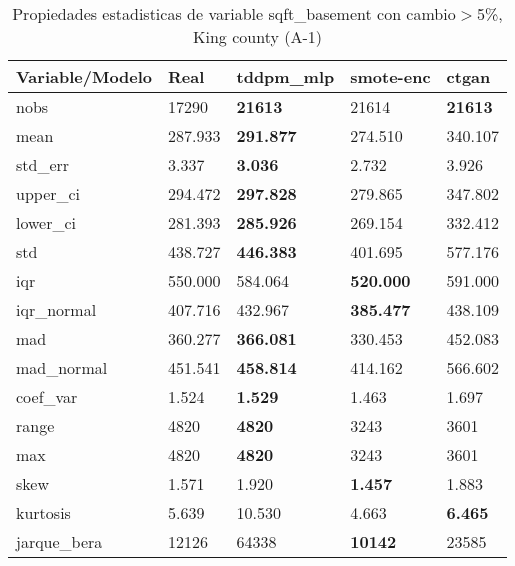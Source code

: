 \begin{table}[H]
\centering
\fontsize{8}{14}\selectfont
\caption{Propiedades estadisticas de variable sqft\_basement con cambio\ensuremath{>}5\%, King county (A-1)}
\label{table-stats-king county-a-1-sqft_basement-short}
\begin{tabular}{|l|m{10em}|m{10em}|m{10em}|m{10em}|}
\hline
 \rowcolor[gray]{0.8}
Variable/Modelo & Real & tddpm\_mlp & smote-enc & ctgan \\
\hline nobs & 17290 & \bfseries 21613 & \cellcolor[rgb]{0.9, 0.54, 0.52} 21614 & \bfseries 21613 \\
\hline mean & 287.933 & \bfseries 291.877 & 274.510 & \cellcolor[rgb]{0.9, 0.54, 0.52} 340.107 \\
\hline std\_err & 3.337 & \bfseries 3.036 & \cellcolor[rgb]{0.9, 0.54, 0.52} 2.732 & 3.926 \\
\hline upper\_ci & 294.472 & \bfseries 297.828 & 279.865 & \cellcolor[rgb]{0.9, 0.54, 0.52} 347.802 \\
\hline lower\_ci & 281.393 & \bfseries 285.926 & 269.154 & \cellcolor[rgb]{0.9, 0.54, 0.52} 332.412 \\
\hline std & 438.727 & \bfseries 446.383 & 401.695 & \cellcolor[rgb]{0.9, 0.54, 0.52} 577.176 \\
\hline iqr & 550.000 & 584.064 & \bfseries 520.000 & \cellcolor[rgb]{0.9, 0.54, 0.52} 591.000 \\
\hline iqr\_normal & 407.716 & 432.967 & \bfseries 385.477 & \cellcolor[rgb]{0.9, 0.54, 0.52} 438.109 \\
\hline mad & 360.277 & \bfseries 366.081 & 330.453 & \cellcolor[rgb]{0.9, 0.54, 0.52} 452.083 \\
\hline mad\_normal & 451.541 & \bfseries 458.814 & 414.162 & \cellcolor[rgb]{0.9, 0.54, 0.52} 566.602 \\
\hline coef\_var & 1.524 & \bfseries 1.529 & 1.463 & \cellcolor[rgb]{0.9, 0.54, 0.52} 1.697 \\
\hline range & 4820 & \bfseries 4820 & \cellcolor[rgb]{0.9, 0.54, 0.52} 3243 & 3601 \\
\hline max & 4820 & \bfseries 4820 & \cellcolor[rgb]{0.9, 0.54, 0.52} 3243 & 3601 \\
\hline skew & 1.571 & \cellcolor[rgb]{0.9, 0.54, 0.52} 1.920 & \bfseries 1.457 & 1.883 \\
\hline kurtosis & 5.639 & \cellcolor[rgb]{0.9, 0.54, 0.52} 10.530 & 4.663 & \bfseries 6.465 \\
\hline jarque\_bera & 12126 & \cellcolor[rgb]{0.9, 0.54, 0.52} 64338 & \bfseries 10142 & 23585 \\

\end{tabular}
\end{table}
